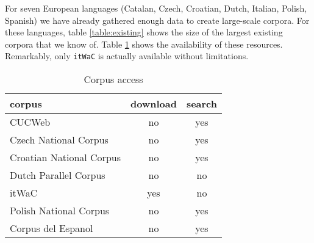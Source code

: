 \documentclass[10pt, a4paper]{article}
\begin{document}
For seven European languages (Catalan, Czech, Croatian, Dutch, Italian,
Polish, Spanish) we have already gathered enough data to create large-scale
corpora. For these languages, table \ref{table:existing} shows the size of the
largest existing corpora that we know of. Table \ref{table:access} shows the
availability of these resources. Remarkably, only {\tt itWaC} is actually 
available without limitations. 

\begin{table}[h]
\centering
\begin{tabular}{|l|c|c|}
\hline
corpus & download & search \\%
\hline
CUCWeb & no & yes \\
Czech National Corpus& no & yes \\%
Croatian National Corpus& no & yes\\%
Dutch Parallel Corpus & no & no \\%
itWaC & yes & no \\%
Polish National Corpus & no & yes\\%
Corpus del Espanol & no & yes \\%
\hline
\end{tabular}
\caption{Corpus access}
\label{table:access}
\end{table}
\end{document}
